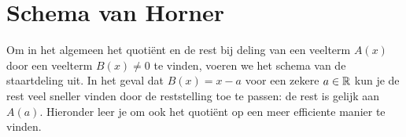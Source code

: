 \documentclass{ximera}
\begin{document}
	\author{Koen de Naeghel - Wiskunde Op Maat}
    \xmsource



\section{Schema van Horner}

Om in het algemeen het quotiënt en de rest bij deling van een veelterm $A(x)$ door een veelterm $B(x) \neq 0$ te vinden, voeren we het schema van de staartdeling uit. In het geval dat $B(x) = x-a$ voor een zekere $a \in \mathbb{R}$ kun je de rest veel sneller vinden door de reststelling toe te passen: de rest is gelijk aan $A(a)$. Hieronder leer je om ook het quotiënt op een meer efficiente manier te vinden. 
\end{document}
